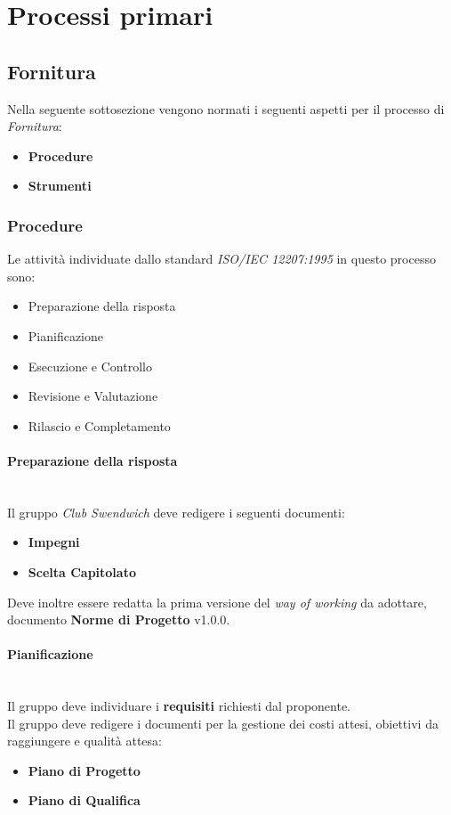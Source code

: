 \section{Processi primari}

\subsection{Fornitura}
Nella seguente sottosezione vengono normati i seguenti aspetti per il 
processo di \textit{Fornitura}:
\begin{itemize}
    \item \textbf{Procedure}
    \item \textbf{Strumenti}
\end{itemize}

\subsubsection{Procedure}

Le attività individuate dallo standard \textit{ISO/IEC 12207:1995} in questo processo sono:
\begin{itemize}
    \item Preparazione della risposta
    \item Pianificazione
    \item Esecuzione e Controllo
    \item Revisione e Valutazione
    \item Rilascio e Completamento
\end{itemize}

\paragraph{Preparazione della risposta}
\mbox{} \\
Il gruppo \textit{Club Swendwich} deve redigere i seguenti documenti:
\begin{itemize}
    \item \textbf{Impegni}
    \item \textbf{Scelta Capitolato}
\end{itemize}
Deve inoltre essere redatta la prima versione del \textit{way of working} da adottare, documento \textbf{Norme di Progetto} v1.0.0.

\paragraph{Pianificazione}
\mbox{} \\
Il gruppo deve individuare i \textbf{requisiti} richiesti dal proponente.\\
Il gruppo deve redigere i documenti per la gestione dei costi attesi, obiettivi da raggiungere e qualità attesa:
\begin{itemize}
    \item \textbf{Piano di Progetto}
    \item \textbf{Piano di Qualifica}
\end{itemize}

